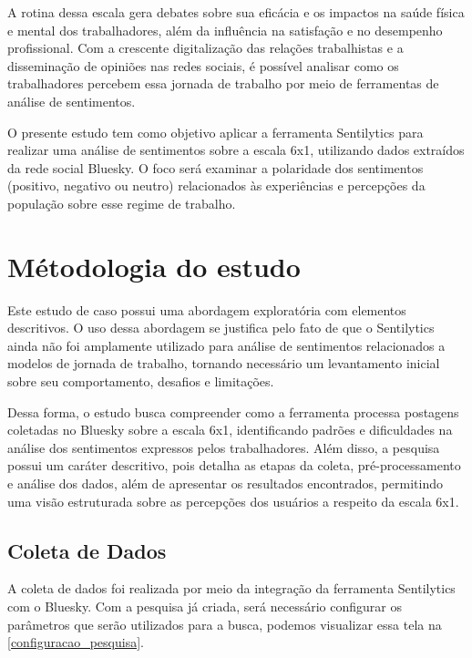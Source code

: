 \documentclass[
	12pt,				%
	oneside,			%
	a4paper,			%
	english,			%
	french,				%
	spanish,			%
	brazil				%
	]{abntex2}
\begin{document}
A rotina dessa escala gera debates sobre sua eficácia e os impactos na
saúde física e mental dos trabalhadores, além da influência na
satisfação e no desempenho profissional. Com a crescente digitalização
das relações trabalhistas e a disseminação de opiniões nas redes
sociais, é possível analisar como os trabalhadores percebem essa jornada
de trabalho por meio de ferramentas de análise de sentimentos.

O presente estudo tem como objetivo aplicar a ferramenta Sentilytics
para realizar uma análise de sentimentos sobre a escala 6x1, utilizando
dados extraídos da rede social Bluesky. O foco será examinar a
polaridade dos sentimentos (positivo, negativo ou neutro) relacionados
às experiências e percepções da população sobre esse regime de trabalho.

\hypertarget{muxe9todologia-do-estudo}{%
\section{Métodologia do estudo}\label{muxe9todologia-do-estudo}}

Este estudo de caso possui uma abordagem exploratória com elementos
descritivos. O uso dessa abordagem se justifica pelo fato de que o
Sentilytics ainda não foi amplamente utilizado para análise de
sentimentos relacionados a modelos de jornada de trabalho, tornando
necessário um levantamento inicial sobre seu comportamento, desafios e
limitações.

Dessa forma, o estudo busca compreender como a ferramenta processa
postagens coletadas no Bluesky sobre a escala 6x1, identificando padrões
e dificuldades na análise dos sentimentos expressos pelos trabalhadores.
Além disso, a pesquisa possui um caráter descritivo, pois detalha as
etapas da coleta, pré-processamento e análise dos dados, além de
apresentar os resultados encontrados, permitindo uma visão estruturada
sobre as percepções dos usuários a respeito da escala 6x1.

\hypertarget{coleta-de-dados}{%
\subsection{Coleta de Dados}\label{coleta-de-dados}}

A coleta de dados foi realizada por meio da integração da ferramenta
Sentilytics com o Bluesky. Com a pesquisa já criada, será necessário
configurar os parâmetros que serão utilizados para a busca, podemos
visualizar essa tela na \autoref{configuracao_pesquisa}.
\end{document}
